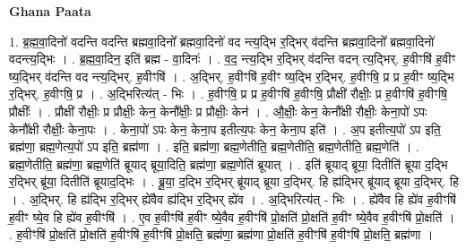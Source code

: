\documentclass[17pt]{extarticle}
\begin{document}
\textbf{Ghana Paata } \newline

1. ब्र॒ह्म॒वा॒दिनो॑ वदन्ति वदन्ति ब्रह्मवा॒दिनो᳚ ब्रह्मवा॒दिनो॑ वद न्त्य॒द्भि र॒द्भिर् व॑दन्ति ब्रह्मवा॒दिनो᳚ ब्रह्मवा॒दिनो॑ वदन्त्य॒द्भिः । . ब्र॒ह्म॒वा॒दिन॒ इति॑ ब्रह्म - वा॒दिनः॑ । . व॒द॒ न्त्य॒द्भि र॒द्भिर् व॑दन्ति वदन् त्य॒द्भिर्. ह॒वीꣳषि॑ ह॒वीꣳ ष्य॒द्भिर् व॑दन्ति वद न्त्य॒द्भिर्. ह॒वीꣳषि॑ । . अ॒द्भिर्. ह॒वीꣳषि॑ ह॒वीꣳ ष्य॒द्भि र॒द्भिर्. ह॒वीꣳषि॒ प्र प्र ह॒वीꣳ ष्य॒द्भि र॒द्भिर्. ह॒वीꣳषि॒ प्र । . अ॒द्भिरित्य॑त् - भिः । . ह॒वीꣳषि॒ प्र प्र ह॒वीꣳषि॑ ह॒वीꣳषि॒ प्रौक्षी॑ रौक्षीः॒ प्र ह॒वीꣳषि॑ ह॒वीꣳषि॒ प्रौक्षीः᳚ । . प्रौक्षी॑ रौक्षीः॒ प्र प्रौक्षीः॒ केन॒ केनौ᳚क्षीः॒ प्र प्रौक्षीः॒ केन॑ । . औ॒क्षीः॒ केन॒ केनौ᳚क्षी रौक्षीः॒ केना॒पो॑ ऽपः केनौ᳚क्षी रौक्षीः॒ केना॒पः । . केना॒पो॑ ऽपः केन॒ केना॒प इतीत्य॒पः केन॒ केना॒प इति॑ । . अ॒प इतीत्य॒पो॑ ऽप इति॒ ब्रह्म॑णा॒ ब्रह्म॒णेत्य॒पो॑ ऽप इति॒ ब्रह्म॑णा । . इति॒ ब्रह्म॑णा॒ ब्रह्म॒णेतीति॒ ब्रह्म॒णेतीति॒ ब्रह्म॒णेतीति॒ ब्रह्म॒णेति॑ । . ब्रह्म॒णेतीति॒ ब्रह्म॑णा॒ ब्रह्म॒णेति॑ ब्रूयाद् ब्रूया॒दिति॒ ब्रह्म॑णा॒ ब्रह्म॒णेति॑ ब्रूयात् । . इति॑ ब्रूयाद् ब्रूया॒ दितीति॑ ब्रूया द॒द्भि र॒द्भिर् ब्रू॑या॒ दितीति॑ ब्रूयाद॒द्भिः । . ब्रू॒या॒ द॒द्भि र॒द्भिर् ब्रू॑याद् ब्रूया द॒द्भिर्. हि ह्य॑द्भिर् ब्रू॑याद् ब्रूया द॒द्भिर्. हि । . अ॒द्भिर्. हि ह्य॑द्भि र॒द्भिर् ह्ये॑वैव ह्य॑द्भि र॒द्भिर् ह्ये॑व । . अ॒द्भिरित्य॑त् - भिः । . ह्ये॑वैव हि ह्ये॑व ह॒वीꣳषि॑ ह॒वीꣳ ष्ये॒व हि ह्ये॑व ह॒वीꣳषि॑ । . ए॒व ह॒वीꣳषि॑ ह॒वीꣳ ष्ये॒वैव ह॒वीꣳषि॑ प्रो॒क्षति॑ प्रो॒क्षति॑ ह॒वीꣳ ष्ये॒वैव ह॒वीꣳषि॑ प्रो॒क्षति॑ । . ह॒वीꣳषि॑ प्रो॒क्षति॑ प्रो॒क्षति॑ ह॒वीꣳषि॑ ह॒वीꣳषि॑ प्रो॒क्षति॒ ब्रह्म॑णा॒ ब्रह्म॑णा प्रो॒क्षति॑ ह॒वीꣳषि॑ ह॒वीꣳषि॑ प्रो॒क्षति॒ ब्रह्म॑णा । \newline
\end{document}
